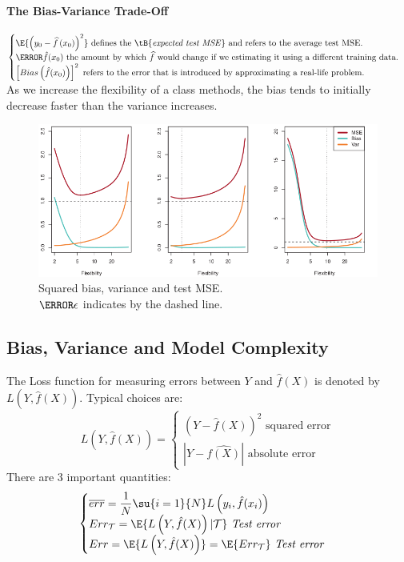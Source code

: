 \paragraph{The Bias-Variance Trade-Off}
$\begin{cases}\E{\left(y_{0}-\widehat{f}\left(x_{0}\right)\right)^{2}}
\text{ defines the \tB{\emph{expected test MSE}} and refers to the 
average test MSE.}\\\V{\hat{f}(x_{0})}\text{ the amount by which $\widehat{f}$ 
would change if we estimating it using a different training data.}\\
\left[Bias\left(\hat{f}(x_{0})\right)\right]^{2}\text{ refers to the error that is introduced by approximating a
real-life problem.}\end{cases}$\\As we increase the flexibility of a
class methods, the bias tends to initially decrease faster than the 
variance increases. 
\begin{figure}[H]
  \centering
  \includegraphics[width=\textwidth]{./chap/1chap/1sec/2images/2_2biaisVarianceMSE.png}
  \caption{Squared bias, variance and test MSE.\\$\V{\epsilon}$ indicates by the dashed line.}
  \label{fig:2.1}
\end{figure}
\subsection{Bias, Variance and Model Complexity}
The Loss function for measuring errors between $Y$ and $\hat{f}(X)$ is denoted by $L\left(Y,
\hat{f}(X)\right)$. Typical choices are: 
$$ L\left(Y,\hat{f}(X)\right) = 
\begin{cases}
	\left(Y-\hat{f}(X)\right)^{2}\text{ squared error}\\
	\left|Y-\hat{f(X)}\right|\text{ absolute error}
\end{cases}
$$
There are 3 important quantities:
$$ 
\begin{cases}
	\overline{err} = \dfrac{1}{N}\su{{i=1}}{N}L\left(y_{i},\hat{f}(x_{i})\right)\\
	Err_{\mathcal{T}}=\E{L\left(Y,\hat{f}(X)\right)|\mathcal{T}}\text{ \emph{Test error}}\\
	Err=\E{L\left(Y,\hat{f}(X)\right)}=\E{Err_{\mathcal{T}}}\text{ \emph{Test error}}
\end{cases}
$$

